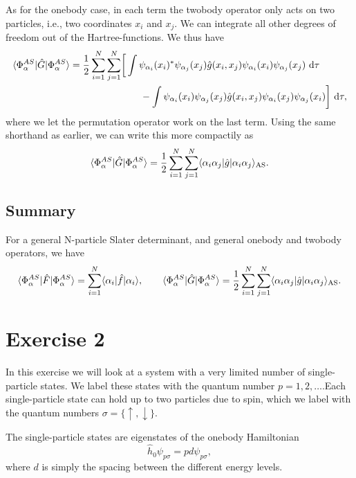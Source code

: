 \documentclass[a4paper, 11pt, notitlepage, english]{article}
\newcommand{\op}[1]{\hat{#1}}
\newcommand{\braopket}[3]{\langle #1 | {#2} | #3 \rangle}
\renewcommand{\d}{{\rm d}}
\begin{document}
As for the onebody case, in each term the twobody operator only acts on two particles, i.e., two coordinates $x_i$ and $x_j$. We can integrate all other degrees of freedom out of the Hartree-functions. We thus have
\begin{align*}
\braopket{\Phi^{AS}_{\alpha}}{\op{G}}{\Phi^{AS}_{\alpha}} 
= \frac{1}{2}\sum_{i=1}^N\sum_{j=1}^N &\bigg[\int \psi_{\alpha_i}(x_i)^*\psi_{\alpha_j}(x_j) \op{g}(x_i,x_j) \psi_{\alpha_i}(x_i)\psi_{\alpha_j}(x_j) \ \d \tau \\
&\qquad - \int \psi_{\alpha_i}(x_i)\psi_{\alpha_j}(x_j) \op{g}(x_i,x_j) \psi_{\alpha_i}(x_j)\psi_{\alpha_j}(x_i) \bigg] \ \d \tau,
\end{align*}
where we let the permutation operator work on the last term. Using the same shorthand as earlier, we can write this more compactily as
$$ \braopket{\Phi^{AS}_{\alpha}}{\op{G}}{\Phi^{AS}_{\alpha}} 
= \frac{1}{2}\sum_{i=1}^N\sum_{j=1}^N \braopket{\alpha_i\alpha_j}{\op{g}}{\alpha_i\alpha_j}_{\rm AS}.$$

\subsection*{Summary}

For a general N-particle Slater determinant, and general onebody and twobody operators, we have
\begin{align*}
\braopket{\Phi^{AS}_{\alpha}}{\op{F}}{\Phi^{AS}_{\alpha}} = \sum_{i=1}^N \braopket{\alpha_i}{\op{f}}{\alpha_i}, \qquad 
\braopket{\Phi^{AS}_{\alpha}}{\op{G}}{\Phi^{AS}_{\alpha}} 
= \frac{1}{2}\sum_{i=1}^N\sum_{j=1}^N \braopket{\alpha_i\alpha_j}{\op{g}}{\alpha_i\alpha_j}_{\rm AS}.
\end{align*}


\clearpage

\section*{Exercise 2}
In this exercise we will look at a system with a very limited number of single-particle states. We label these states with the quantum number $p=1,2,\ldots$.Each single-particle state can hold up to two particles due to spin, which we label with the quantum numbers $\sigma=\{\uparrow, \downarrow\}$.

The single-particle states are eigenstates of the onebody Hamiltonian
$$\op{h}_0 \psi_{p\sigma} = pd\psi_{p\sigma},$$
where $d$ is simply the spacing between the different energy levels.
\end{document}
